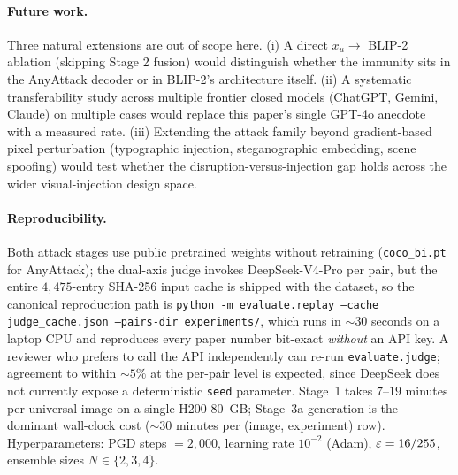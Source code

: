 \paragraph{Future work.}
Three natural extensions are out of scope here. (i) A direct $x_u \to$ BLIP-2 ablation (skipping Stage 2 fusion) would distinguish whether the immunity sits in the AnyAttack decoder or in BLIP-2's architecture itself. (ii) A systematic transferability study across multiple frontier closed models (ChatGPT, Gemini, Claude) on multiple cases would replace this paper's single GPT-4o anecdote with a measured rate. (iii) Extending the attack family beyond gradient-based pixel perturbation (typographic injection, steganographic embedding, scene spoofing) would test whether the disruption-versus-injection gap holds across the wider visual-injection design space.

\paragraph{Reproducibility.}
Both attack stages use public pretrained weights without retraining (\texttt{coco\_bi.pt} for AnyAttack); the dual-axis judge invokes DeepSeek-V4-Pro per pair, but the entire $4{,}475$-entry SHA-256 input cache is shipped with the dataset, so the canonical reproduction path is \texttt{python -m evaluate.replay --cache judge\_cache.json --pairs-dir experiments/}, which runs in $\sim 30$ seconds on a laptop CPU and reproduces every paper number bit-exact \emph{without} an API key. A reviewer who prefers to call the API independently can re-run \texttt{evaluate.judge}; agreement to within $\sim 5\%$ at the per-pair level is expected, since DeepSeek does not currently expose a deterministic \texttt{seed} parameter. Stage~1 takes $7$--$19$ minutes per universal image on a single H200 80~GB; Stage~3a generation is the dominant wall-clock cost ($\sim 30$ minutes per (image, experiment) row). Hyperparameters: PGD steps $= 2{,}000$, learning rate $10^{-2}$ (Adam), $\varepsilon = 16/255$, ensemble sizes $N \in \{2, 3, 4\}$.

